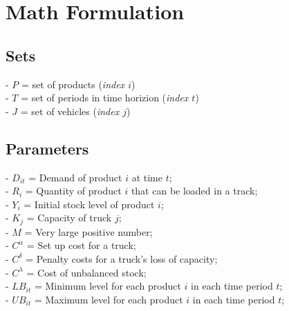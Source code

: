 \documentclass[a4paper,12pt,titlepage]{article}
\begin{document}
\section*{Math Formulation}
\subsection*{Sets}
- $P$ = set of products (\textit{index $i$})\\
- $T$ = set of periods in time horizion (\textit{index $t$})\\
- $J$ = set of vehicles (\textit{index $j$})
\subsection*{Parameters}
- $D_{it}$ = Demand of product $i$ at time $t$;\\
- $R_i$ = Quantity of product $i$ that can be loaded in a track;\\
- $Y_i$ = Initial stock level of product $i$;\\
- $K_j$ = Capacity of truck $j$;\\
- $M$ = Very large positive number;\\
- $C^{\alpha}$ = Set up cost for a truck;\\
- $C^{\delta}$ = Penalty costs for a truck's loss of capacity;\\
- $C^{\lambda}$ = Cost of unbalanced stock;\\
- $LB_{it}$ = Minimum level for each product $i$ in each time period $t$;\\
- $UB_{it}$ = Maximum level for each product $i$ in each time period $t$;
\end{document}
